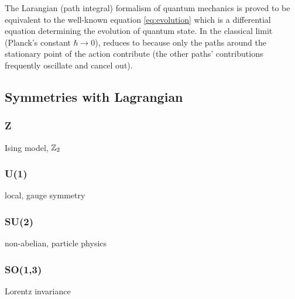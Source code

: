 The Larangian (path integral) formalism of quantum mechanics is proved to be equivalent to the well-known \schrodinger equation \cref{eq:evolution} \cite[Chp4]{feynmanQuantumMechanicsPath2010} 
which is a differential equation determining the evolution of quantum state.
In the classical limit (Planck's constant $\hbar\to 0$),  reduces to 
because only the paths around the stationary point of the action contribute 
(the other paths' contributions frequently oscillate and cancel out).

\subsection{Symmetries with Lagrangian}
\subsubsection{Z}
Ising model, $\mathbb{Z}_2$

\subsubsection{U(1)}
\cite{kogutIntroductionLatticeGauge1979}
local, gauge symmetry

\subsubsection{SU(2)}
non-abelian, particle physics

\subsubsection{SO(1,3)}
Lorentz invariance
